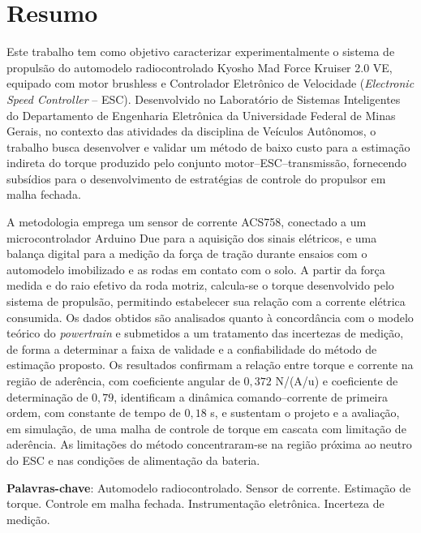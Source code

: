 \chapter*{Resumo}

Este trabalho tem como objetivo caracterizar experimentalmente o sistema de propulsão do
automodelo radiocontrolado Kyosho Mad Force Kruiser 2.0 VE, equipado com motor brushless e
Controlador Eletrônico de Velocidade (\emph{Electronic Speed Controller} -- ESC).
Desenvolvido no Laboratório de Sistemas Inteligentes do Departamento de Engenharia
Eletrônica da Universidade Federal de Minas Gerais, no contexto das atividades da
disciplina de Veículos Autônomos, o trabalho busca desenvolver e validar um método de
baixo custo para a estimação indireta do torque produzido pelo conjunto
motor--ESC--transmissão, fornecendo subsídios para o desenvolvimento de estratégias de
controle do propulsor em malha fechada.

A metodologia emprega um sensor de
corrente ACS758, conectado a um microcontrolador Arduino Due para a aquisição dos sinais
elétricos, e uma balança digital para a medição da força de tração durante ensaios com o
automodelo imobilizado e as rodas em contato com o solo. A partir da força medida e do raio
efetivo da roda motriz, calcula-se o torque desenvolvido pelo sistema de propulsão, permitindo
estabelecer sua relação com a corrente elétrica consumida. Os dados obtidos são analisados
quanto à concordância com o modelo teórico do \emph{powertrain} e submetidos a um tratamento
das incertezas de medição, de forma a determinar a faixa de validade e a confiabilidade do
método de estimação proposto. Os resultados confirmam a relação entre torque e corrente na
região de aderência, com coeficiente angular de $0{,}372$ N/(A/u) e coeficiente de
determinação de $0{,}79$, identificam a dinâmica comando--corrente de primeira ordem, com
constante de tempo de $0{,}18$ s, e sustentam o projeto e a avaliação, em simulação, de uma
malha de controle de torque em cascata com limitação de aderência. As limitações do método
concentraram-se na região próxima ao neutro do ESC e nas condições de alimentação da
bateria.

\vspace{0.5cm}
\noindent\textbf{Palavras-chave}: Automodelo radiocontrolado. Sensor de corrente. Estimação de
torque. Controle em malha fechada. Instrumentação eletrônica. Incerteza de medição.
